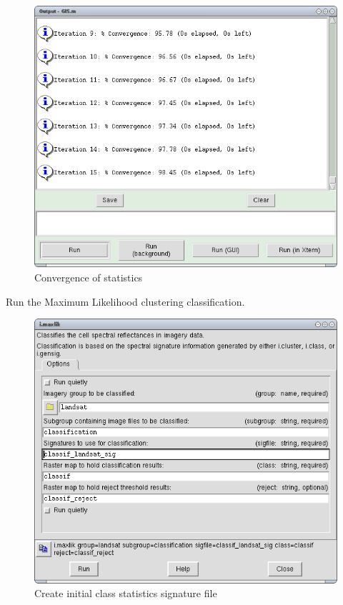 \begin{figure}[htbp]
   \centering
   \includegraphics[scale=0.35]{grass_rs010.png}
   \caption{Convergence of statistics}
   \label{fig:grass_rs010}
\end{figure}

Run the Maximum Likelihood clustering classification.

\begin{figure}[htbp]
   \centering
   \includegraphics[scale=0.35]{grass_rs011.png}
   \caption{Create initial class statistics signature file}
   \label{fig:grass_rs011}
\end{figure}


